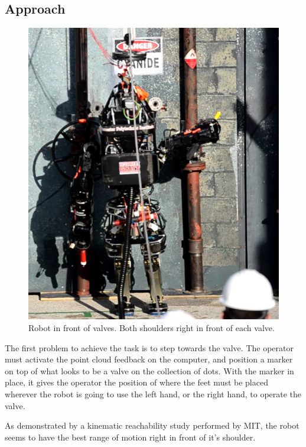 \documentclass[12pt]{report}
\begin{document}
\subsection{Approach}
\begin{figure}
  \begin{center}
    \includegraphics[scale=0.2]{images/turn_valve.png}
  \end{center}
  \caption{Robot in front of valves. Both shoulders right in front of each valve.}
\end{figure}
The first problem to achieve the task is to step towards the valve. The operator must activate the point cloud feedback on the computer, and position a marker on top of what looks to be a valve on the collection of dots. With the marker in place, it gives the operator the position of where the feet must be placed wherever the robot is going to use the left hand, or the right hand, to operate the valve. 

As demonstrated by a kinematic reachability study performed by MIT, the robot seems to have the best range of motion right in front of it's shoulder. \cite{mitaffordance} 
\end{document}
